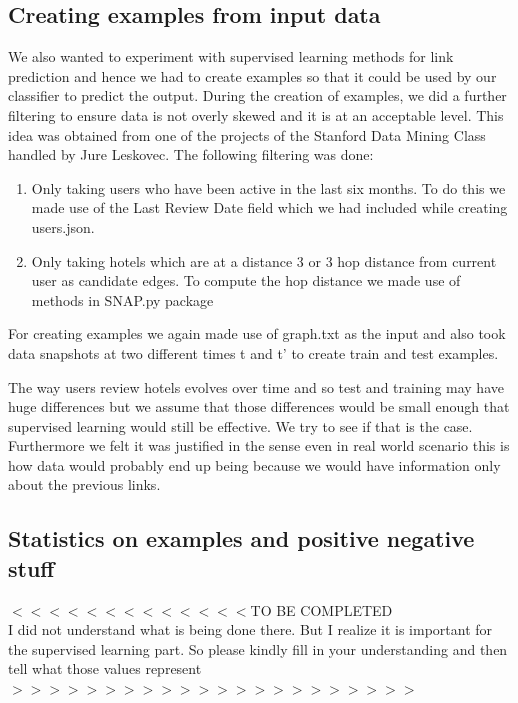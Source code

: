 \documentclass[letterpaper,twocolumn,11pt]{article}
\begin{document}
\subsection{Creating examples from input data}

We also wanted to experiment with supervised learning methods for link prediction and hence we had to create examples so that it could be used by our classifier to predict the output. During the creation of examples, we did a further filtering to ensure data is not overly skewed and it is at an acceptable level. This idea was obtained from one of the projects of the Stanford Data Mining Class handled by Jure Leskovec. The following filtering was done:

\begin{enumerate}
\item Only taking users who have been active in the last six months. To do this we made use of the Last Review Date field which we had included while creating users.json.

\item Only taking hotels which are at a distance 3 or 3 hop distance from current user as candidate edges. To compute the hop distance we made use of methods in SNAP.py package
\end{enumerate}

For creating examples we again made use of graph.txt as the input and also took data snapshots at two different times t and t' to create train and test examples.

The way users review hotels evolves over time and so test and training may have huge differences but we assume that those differences would be small enough that supervised learning would still be effective. We try to see if that is the case. Furthermore we felt it was justified in the sense even in real world scenario this is how data would probably end up being because we would have information only about the previous links.

\subsection { Statistics on examples and positive negative stuff}

$<<<<<<<<<<<<< $TO BE COMPLETED \\
I did not understand what is being done there. But I realize it is important for the supervised learning part. So please kindly fill in your understanding and then tell what those values represent \\
$>>>>>>>>>>>>>>>>>>>>>>$
\end{document}
